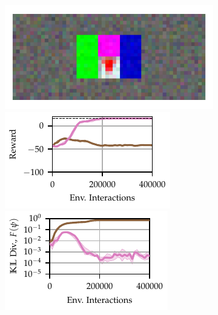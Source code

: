 \begin{figure}[t]

    \begin{subfigure}[t]{0.3\textwidth}
        \includegraphics[width=\textwidth]{figures/OSC/TD1.pdf}
        \includegraphics[width=\textwidth]{figures/OSC/cr_osc_6/OSC_TD1_lam05_reward_TigerDoor_True_v1_cr_osc_6_q0_2021_06_07__23_18_14_.pdf}
        \includegraphics[width=\textwidth]{figures/OSC/cr_osc_6/OSC_TD1_lam05_divergence_TigerDoor_True_v1_cr_osc_6_q0_2021_06_07__23_18_14_.pdf}

\end{subfigure}
\end{figure}
